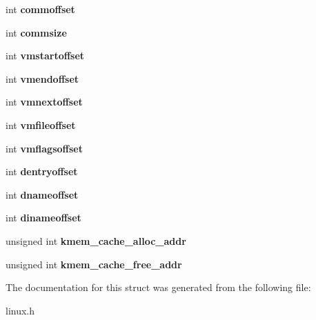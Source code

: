 \begin{DoxyCompactItemize}
\item 
\hypertarget{structkoffset_ac3a82d29f9e4931227c01a8bfbf49233}{int {\bfseries commoffset}}\label{structkoffset_ac3a82d29f9e4931227c01a8bfbf49233}

\item 
\hypertarget{structkoffset_a2d031b15bd9eca2e9369fd8a1bdda0e6}{int {\bfseries commsize}}\label{structkoffset_a2d031b15bd9eca2e9369fd8a1bdda0e6}

\item 
\hypertarget{structkoffset_a59abe34a04b7648651c485afeb691643}{int {\bfseries vmstartoffset}}\label{structkoffset_a59abe34a04b7648651c485afeb691643}

\item 
\hypertarget{structkoffset_ae1f09c16242160d13eb39d1873eca7ac}{int {\bfseries vmendoffset}}\label{structkoffset_ae1f09c16242160d13eb39d1873eca7ac}

\item 
\hypertarget{structkoffset_a6fdef5531a618faa643796d98d855eb5}{int {\bfseries vmnextoffset}}\label{structkoffset_a6fdef5531a618faa643796d98d855eb5}

\item 
\hypertarget{structkoffset_a87197745a3d17435c6655c8c862385b7}{int {\bfseries vmfileoffset}}\label{structkoffset_a87197745a3d17435c6655c8c862385b7}

\item 
\hypertarget{structkoffset_af298d549bfa906d21b9fa90513f5681f}{int {\bfseries vmflagsoffset}}\label{structkoffset_af298d549bfa906d21b9fa90513f5681f}

\item 
\hypertarget{structkoffset_a5180311a79fa59ab8aa60e3a1ef91aee}{int {\bfseries dentryoffset}}\label{structkoffset_a5180311a79fa59ab8aa60e3a1ef91aee}

\item 
\hypertarget{structkoffset_af575d46f9f5524fd5cab12921aaf64b4}{int {\bfseries dnameoffset}}\label{structkoffset_af575d46f9f5524fd5cab12921aaf64b4}

\item 
\hypertarget{structkoffset_a36537185c663a5ec3719d307c8c28cd1}{int {\bfseries dinameoffset}}\label{structkoffset_a36537185c663a5ec3719d307c8c28cd1}

\item 
\hypertarget{structkoffset_a1d70a0b510ca6e6cf5f037dea3db4bf6}{unsigned int {\bfseries kmem\-\_\-cache\-\_\-alloc\-\_\-addr}}\label{structkoffset_a1d70a0b510ca6e6cf5f037dea3db4bf6}

\item 
\hypertarget{structkoffset_af089f4119d56acd87d023811448c9c3c}{unsigned int {\bfseries kmem\-\_\-cache\-\_\-free\-\_\-addr}}\label{structkoffset_af089f4119d56acd87d023811448c9c3c}

\end{DoxyCompactItemize}


\-The documentation for this struct was generated from the following file\-:\begin{DoxyCompactItemize}
\item 
linux.\-h\end{DoxyCompactItemize}
